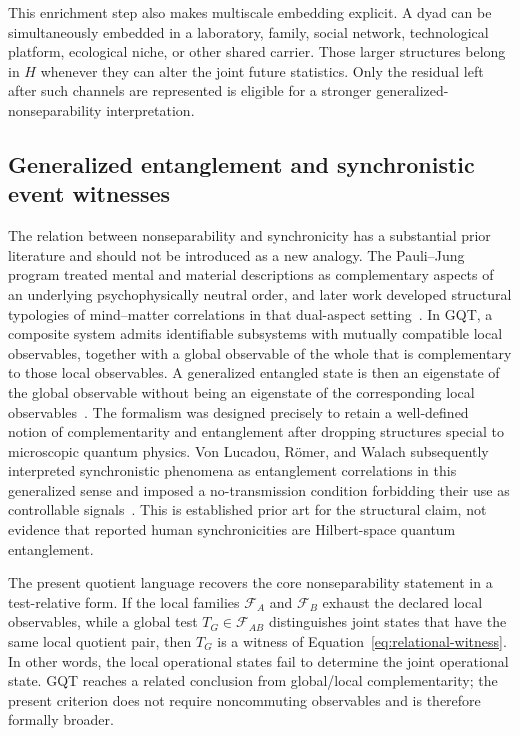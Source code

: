 \documentclass[11pt]{article}
\newcommand{\F}{\mathcal F}
\begin{document}
This enrichment step also makes multiscale embedding explicit. A dyad can be simultaneously embedded in a laboratory, family, social network, technological platform, ecological niche, or other shared carrier. Those larger structures belong in $H$ whenever they can alter the joint future statistics. Only the residual left after such channels are represented is eligible for a stronger generalized-nonseparability interpretation.

\subsection{Generalized entanglement and synchronistic event witnesses}
\label{sec:synchronicity}

The relation between nonseparability and synchronicity has a substantial prior literature and should not be introduced as a new analogy. The Pauli--Jung program treated mental and material descriptions as complementary aspects of an underlying psychophysically neutral order, and later work developed structural typologies of mind--matter correlations in that dual-aspect setting~\cite{atmanspacherfach2013,atmanspacher2014}. In GQT, a composite system admits identifiable subsystems with mutually compatible local observables, together with a global observable of the whole that is complementary to those local observables. A generalized entangled state is then an eigenstate of the global observable without being an eigenstate of the corresponding local observables~\cite{atmanspacher2002,filkromer2011}. The formalism was designed precisely to retain a well-defined notion of complementarity and entanglement after dropping structures special to microscopic quantum physics. Von Lucadou, Römer, and Walach subsequently interpreted synchronistic phenomena as entanglement correlations in this generalized sense and imposed a no-transmission condition forbidding their use as controllable signals~\cite{lucadou2007}. This is established prior art for the structural claim, not evidence that reported human synchronicities are Hilbert-space quantum entanglement.

The present quotient language recovers the core nonseparability statement in a test-relative form. If the local families $\F_A$ and $\F_B$ exhaust the declared local observables, while a global test $T_G\in\F_{AB}$ distinguishes joint states that have the same local quotient pair, then $T_G$ is a witness of Equation~\eqref{eq:relational-witness}. In other words, the local operational states fail to determine the joint operational state. GQT reaches a related conclusion from global/local complementarity; the present criterion does not require noncommuting observables and is therefore formally broader.
\end{document}
